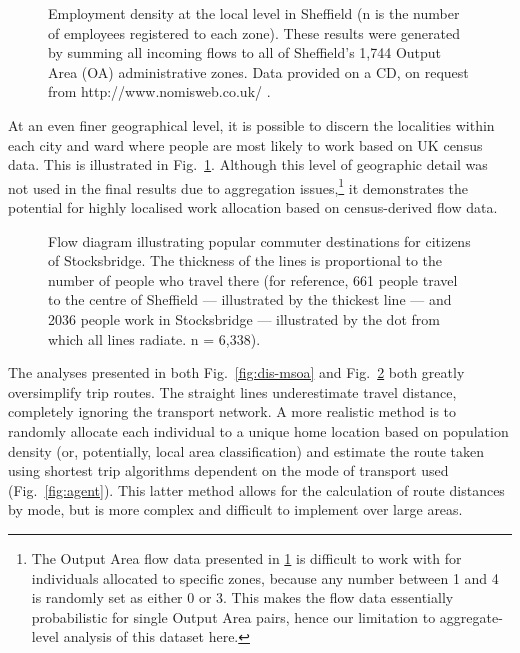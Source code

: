 \begin{figure}
\caption[Employment density at the local level in Sheffield]
{Employment density at the local level in Sheffield (n is the number of
employees registered to each zone). These results
were generated by summing all incoming flows to all of Sheffield's 1,744
Output Area (OA) administrative zones. Data provided on a CD, on request from
http://www.nomisweb.co.uk/ .}
\label{fig:sworkdens}
\end{figure}
At an even finer geographical level, it is possible to discern the localities
within each city and ward where people are most likely to work based on UK
census data. This is illustrated in Fig.~\ref{fig:sworkdens}. Although this
level of geographic detail was not used in the final
results due to aggregation
issues,\footnote{The
Output Area flow data presented in \ref{fig:sworkdens} is difficult
to work with for individuals allocated to specific zones, because any
number between 1 and 4 is randomly set as either 0 or 3. This makes
the flow data essentially probabilistic for single Output Area pairs,
hence our limitation to aggregate-level analysis of this dataset here.
}
it demonstrates the potential for highly localised work allocation based on
census-derived flow data.

\begin{figure}
\caption[Flow diagram of commuter destinations from Stocksbridge]
{Flow diagram illustrating popular commuter destinations for citizens
of Stocksbridge. The thickness of the lines is proportional to the number of
people who travel there (for reference, 661 people travel to
the centre of Sheffield --- illustrated by the thickest line ---
and 2036 people work in Stocksbridge --- illustrated by the dot
from which all lines radiate. n = 6,338).}
\label{fig:sflow}
\end{figure}

The analyses presented in both Fig.~\ref{fig:dis-msoa} and Fig.~\ref{fig:sflow}
both greatly oversimplify trip routes. The straight lines underestimate travel
distance, completely ignoring the transport network. A more
realistic method is to randomly allocate each individual to a unique home
location based on
population density (or, potentially, local area classification) and estimate
the route taken using shortest trip algorithms dependent on the mode of
transport used (Fig.~\ref{fig:agent}). This latter method allows for the
calculation of route distances by mode, but is more complex and difficult to
implement over large areas.

